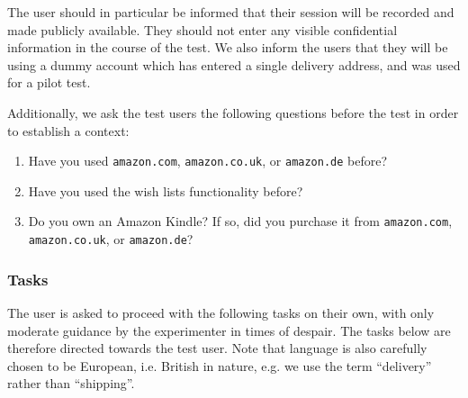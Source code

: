 The user should in particular be informed that their session will be recorded
and made publicly available. They should not enter any visible confidential
information in the course of the test. We also inform the users that they will
be using a dummy account which has entered a single delivery address, and was
used for a pilot test.

Additionally, we ask the test users the following questions before the test in
order to establish a context:

\begin{enumerate}

\item Have you used \texttt{amazon.com}, \texttt{amazon.co.uk}, or
\texttt{amazon.de} before?

\item Have you used the wish lists functionality before?

\item Do you own an Amazon Kindle? If so, did you purchase it from
\texttt{amazon.com}, \texttt{amazon.co.uk}, or \texttt{amazon.de}?

\end{enumerate}

\subsubsection{Tasks}

The user is asked to proceed with the following tasks on their own, with only
moderate guidance by the experimenter in times of despair. The tasks below are
therefore directed towards the test user. Note that language is also carefully
chosen to be European, i.e. British in nature, e.g. we use the term
``delivery'' rather than ``shipping''.

